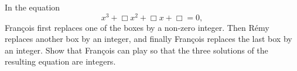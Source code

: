 In the equation
\[
x^3 + \Box x^2 + \Box x + \Box = 0,
\]
François first replaces one of the boxes by a non-zero integer. Then Rémy replaces another box by an integer, and finally François replaces the last box by an integer. Show that François can play so that the three solutions of the resulting equation are integers.
